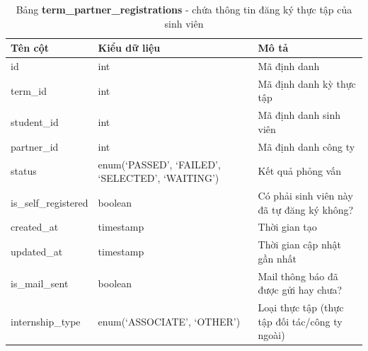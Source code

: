 \documentclass[./../main.tex]{subfiles}
\begin{document}
\begin{table}[H]
	\caption[Bảng term\_partner\_registrations]{Bảng \textbf{term\_partner\_registrations} - chứa thông tin đăng ký thực tập của sinh viên}
	\label{tab:db_term_partner_regs}
	\begin{tabularx}{\textwidth}{|l|X|X|}
	\hline
	\textbf{Tên cột}     & \textbf{Kiểu dữ liệu}                           & \textbf{Mô tả}                                 \\ \hline
	id                   & int                                             & Mã định danh                                   \\ \hline
	term\_id             & int                                             & Mã định danh kỳ thực tập                       \\ \hline
	student\_id          & int                                             & Mã định danh sinh viên                         \\ \hline
	partner\_id          & int                                             & Mã định danh công ty                           \\ \hline
	status               & enum(‘PASSED', ‘FAILED', ‘SELECTED', ‘WAITING') & Kết quả phỏng vấn                              \\ \hline
	is\_self\_registered & boolean                                         & Có phải sinh viên này đã tự đăng ký không?     \\ \hline
	created\_at          & timestamp                                       & Thời gian tạo                                  \\ \hline
	updated\_at          & timestamp                                       & Thời gian cập nhật gần nhất                    \\ \hline
	is\_mail\_sent       & boolean                                         & Mail thông báo đã được gửi hay chưa?           \\ \hline
	internship\_type     & enum(‘ASSOCIATE’, ‘OTHER')                      & Loại thực tập (thực tập đối tác/công ty ngoài) \\ \hline
	\end{tabularx}
\end{table}
\end{document}
